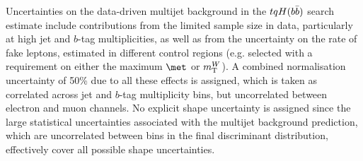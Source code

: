 Uncertainties on the data-driven multijet background in the $tqH(b\bar{b})$ search estimate include
contributions from the limited sample size in data, particularly at high jet and $b$-tag multiplicities, as 
well as from the uncertainty on the rate of fake leptons, estimated in 
different control regions (e.g. selected with a requirement on either the maximum $\met$ or $m_{\mathrm T}^W$). 
A combined normalisation uncertainty of 50\% due 
to all these effects is assigned, which is taken as correlated across jet
and $b$-tag multiplicity bins, but uncorrelated between electron and muon channels. 
No explicit shape uncertainty is assigned since the large statistical uncertainties associated with
the multijet background prediction, which are uncorrelated 
between bins in the final discriminant distribution, effectively cover all possible shape uncertainties. 

